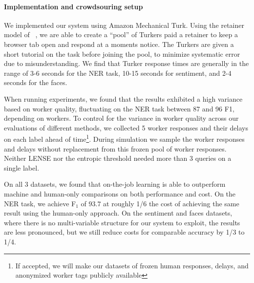 \paragraph{Implementation and crowdsouring setup}

We implemented our system using Amazon Mechanical Turk.
Using the retainer model of ~\cite{bernstein2011crowds}, we are able to create a ``pool'' of Turkers paid a retainer to keep a browser tab open and respond at a moments notice.
The Turkers are given a short tutorial on the task before joining the pool, to minimize systematic error due to misunderstanding.
We find that Turker response times are generally in the range of 3-6 seconds for the NER task, 10-15 seconds for sentiment, and 2-4 seconds for the faces.

When running experiments, we found that the results exhibited a high variance based on worker quality, fluctuating on the NER task between 87 and 96 F1, depending on workers.
To control for the variance in worker quality across our evaluations of different methods, we collected 5 worker responses and their delays on each label ahead of time\footnote{If accepted, we will make our datasets of frozen human responses, delays, and anonymized worker tags publicly available}.
During simulation we sample the worker responses and delays without replacement from this frozen pool of worker responses. 
Neither LENSE nor the entropic threshold needed more than 3 queries on a single label.

%
%

On all 3 datasets, we found that on-the-job learning is able to outperform machine and human-only comparisons on both performance and cost. On the NER task, we achieve F$_1$ of $93.7$ at roughly 1/6 the cost of achieving the same result using the human-only approach. On the sentiment and faces datasets, where there is no multi-variable structure for our system to exploit, the results are less pronounced, but we still reduce costs for comparable accuracy by 1/3 to 1/4.

